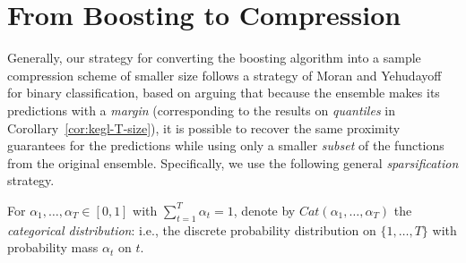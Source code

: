 
\chapter{From Boosting to Compression}
    
\label{subsec:boosting-to-compression}


Generally, our strategy for converting the boosting algorithm  into a sample compression scheme of smaller size 
follows a strategy of Moran and Yehudayoff for binary classification, based on arguing that because the ensemble makes its predictions 
with a \emph{margin} (corresponding to the results on \emph{quantiles} in Corollary~\ref{cor:kegl-T-size}), 
it is possible to recover the same proximity guarantees for the predictions while using only a smaller \emph{subset} of the 
functions from the original ensemble.  Specifically, we use the following general \emph{sparsification} strategy.

For $\alpha_{1},\ldots,\alpha_{T} \in [0,1]$ with $\sum_{t=1}^{T} \alpha_{t} = 1$, 
denote by $Cat(\alpha_{1},\ldots,\alpha_{T})$ the \emph{categorical distribution}: 
i.e., the discrete probability distribution on $\{1,\ldots,T\}$ with probability mass $\alpha_{t}$ on $t$.

